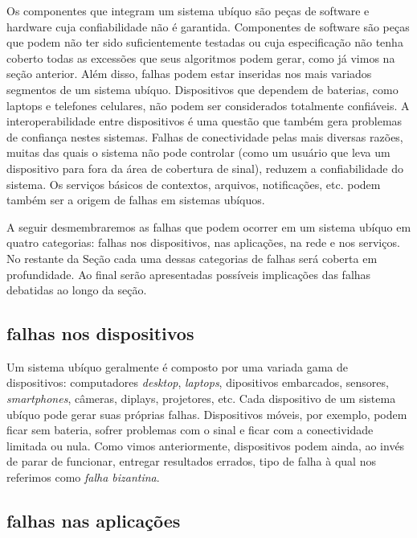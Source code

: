 Os componentes que integram um sistema ubíquo são peças de software e hardware cuja confiabilidade não é garantida. Componentes de software são peças que podem não ter sido suficientemente testadas ou cuja especificação não tenha coberto todas as excessões que seus algoritmos podem gerar, como já vimos na seção anterior. Além disso, falhas podem estar inseridas nos mais variados segmentos de um sistema ubíquo. Dispositivos que dependem de baterias, como laptops e telefones celulares, não podem ser considerados totalmente confiáveis. A interoperabilidade entre dispositivos é uma questão que também gera problemas de confiança nestes sistemas. Falhas de conectividade pelas mais diversas razões, muitas das quais o sistema não pode controlar (como um usuário que leva um dispositivo para fora da área de cobertura de sinal), reduzem a confiabilidade do sistema. Os serviços básicos de contextos, arquivos, notificações, etc. podem também ser a origem de falhas em sistemas ubíquos.

A seguir desmembraremos as falhas que podem ocorrer em um sistema ubíquo em quatro categorias: falhas nos dispositivos, nas aplicações, na rede e nos serviços. No restante da Seção cada uma dessas categorias de falhas será coberta em profundidade. Ao final serão apresentadas possíveis implicações das falhas debatidas ao longo da seção.

\subsection{falhas nos dispositivos} %
\label{sub:falhas_nos_dispositivos}

Um sistema ubíquo geralmente é composto por uma variada gama de dispositivos: computadores \emph{desktop}, \emph{laptops}, dipositivos embarcados, sensores, \emph{smartphones}, câmeras, diplays, projetores, etc. Cada dispositivo de um sistema ubíquo pode gerar suas próprias falhas. Dispositivos móveis, por exemplo, podem ficar sem bateria, sofrer problemas com o sinal e ficar com a conectividade limitada ou nula. Como vimos anteriormente, dispositivos podem ainda, ao invés de parar de funcionar, entregar resultados errados, tipo de falha à qual nos referimos como \emph{falha bizantina}.


\subsection{falhas nas aplicações} %
\label{sub:falhas_nas_aplicacoes}

